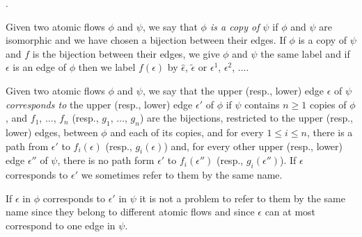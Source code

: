 


.


\newpage

\begin{definition}
Given two atomic flows $\phi$ and $\psi$, we say that \emph{$\phi$ is a copy of $\psi$} if $\phi$ and $\psi$ are isomorphic and we have chosen a bijection between their edges. If $\phi$ is a copy of $\psi$ and $f$ is the bijection between their edges, we give $\phi$ and $\psi$ the same label and if $\epsilon$ is an edge of $\phi$ then we label $f(\epsilon)$ by $\hat\epsilon$, $\tilde\epsilon$ or $\epsilon^1$, $\epsilon^2$, $\dots$.
\end{definition}

\begin{definition}
Given two atomic flows $\phi$ and $\psi$, we say that the upper (resp., lower) edge $\epsilon$ of $\psi$ \emph{corresponds to} the upper (resp., lower) edge $\epsilon'$ of $\phi$ if $\psi$ contains $n\ge1$ copies of $\phi$, and $f_1$, $\dots$, $f_n$ (resp., $g_1$, $\dots$, $g_n$) are the bijections, restricted to the upper (resp., lower) edges, between $\phi$ and each of its copies, and for every $1\le i\le n$, there is a path from $\epsilon'$ to $f_i(\epsilon)$ (resp., $g_i(\epsilon)$) and, for every other upper (resp., lower) edge $\epsilon''$ of $\psi$, there is no path form $\epsilon'$ to $f_i(\epsilon'')$ (resp., $g_i(\epsilon'')$). If $\epsilon$ corresponds to $\epsilon'$ we sometimes refer to them by the same name.
\end{definition}

\begin{remark}
If $\epsilon$ in $\phi$ corresponds to $\epsilon'$ in $\psi$ it is not a problem to refer to them by the same name since they belong to different atomic flows and since $\epsilon$ can at most correspond to one edge in $\psi$.
\end{remark}

